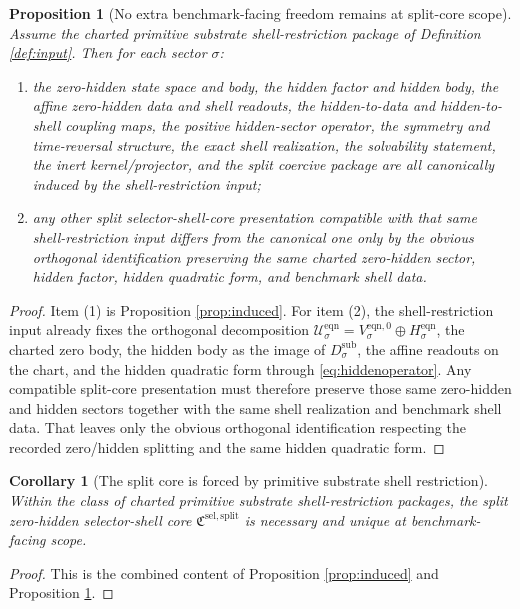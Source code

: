 \documentclass[11pt]{article}
\newcommand{\SelectorCore}{\mathfrak C^{\mathrm{sel,split}}}
\newcommand{\EqnSpace}[1]{\mathcal U_{#1}^{\mathrm{eqn}}}
\newcommand{\EqnZero}[1]{V_{#1}^{\mathrm{eqn},0}}
\newcommand{\EqnHidden}[1]{H_{#1}^{\mathrm{eqn}}}
\newcommand{\SeedHiddenBody}[1]{D_{#1}^{\mathrm{sub}}}
\newtheorem{proposition}{Proposition}
\newtheorem{corollary}{Corollary}
\begin{document}
\begin{proposition}[No extra benchmark-facing freedom remains at split-core scope]
\label{prop:unique}
Assume the charted primitive substrate shell-restriction package of Definition \ref{def:input}. Then for each sector \(\sigma\):
\begin{enumerate}
    \item the zero-hidden state space and body, the hidden factor and hidden body, the affine zero-hidden data and shell readouts, the hidden-to-data and hidden-to-shell coupling maps, the positive hidden-sector operator, the symmetry and time-reversal structure, the exact shell realization, the solvability statement, the inert kernel/projector, and the split coercive package are all canonically induced by the shell-restriction input;
    \item any other split selector-shell-core presentation compatible with that same shell-restriction input differs from the canonical one only by the obvious orthogonal identification preserving the same charted zero-hidden sector, hidden factor, hidden quadratic form, and benchmark shell data.
\end{enumerate}
\end{proposition}

\begin{proof}
Item (1) is Proposition \ref{prop:induced}. For item (2), the shell-restriction input already fixes the orthogonal decomposition \(\EqnSpace{\sigma}=\EqnZero{\sigma}\oplus\EqnHidden{\sigma}\), the charted zero body, the hidden body as the image of \(\SeedHiddenBody{\sigma}\), the affine readouts on the chart, and the hidden quadratic form through \eqref{eq:hiddenoperator}. Any compatible split-core presentation must therefore preserve those same zero-hidden and hidden sectors together with the same shell realization and benchmark shell data. That leaves only the obvious orthogonal identification respecting the recorded zero/hidden splitting and the same hidden quadratic form.
\end{proof}

\begin{corollary}[The split core is forced by primitive substrate shell restriction]
\label{cor:forced}
Within the class of charted primitive substrate shell-restriction packages, the split zero-hidden selector-shell core \(\SelectorCore\) is necessary and unique at benchmark-facing scope.
\end{corollary}

\begin{proof}
This is the combined content of Proposition \ref{prop:induced} and Proposition \ref{prop:unique}.
\end{proof}
\end{document}
